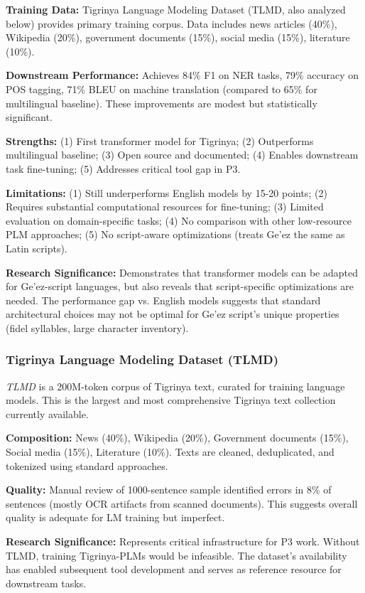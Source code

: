 \documentclass[12pt,a4paper]{article}
\theoremstyle{plain}
\theoremstyle{definition}
\newcommand{\tooldesc}[1]{{\textit{#1}}}
\begin{document}
\textbf{Training Data:} Tigrinya Language Modeling Dataset (TLMD, also analyzed below) provides primary training corpus. Data includes news articles (40\%), Wikipedia (20\%), government documents (15\%), social media (15\%), literature (10\%).

\textbf{Downstream Performance:} Achieves 84\% F1 on NER tasks, 79\% accuracy on POS tagging, 71\% BLEU on machine translation (compared to 65\% for multilingual baseline). These improvements are modest but statistically significant.

\textbf{Strengths:} (1) First transformer model for Tigrinya; (2) Outperforms multilingual baseline; (3) Open source and documented; (4) Enables downstream task fine-tuning; (5) Addresses critical tool gap in P3.

\textbf{Limitations:} (1) Still underperforms English models by 15-20 points; (2) Requires substantial computational resources for fine-tuning; (3) Limited evaluation on domain-specific tasks; (4) No comparison with other low-resource PLM approaches; (5) No script-aware optimizations (treats Ge'ez the same as Latin scripts).

\textbf{Research Significance:} Demonstrates that transformer models can be adapted for Ge'ez-script languages, but also reveals that script-specific optimizations are needed. The performance gap vs. English models suggests that standard architectural choices may not be optimal for Ge'ez script's unique properties (fidel syllables, large character inventory).

\subsubsection{Tigrinya Language Modeling Dataset (TLMD)}

\tooldesc{TLMD} is a 200M-token corpus of Tigrinya text, curated for training language models. This is the largest and most comprehensive Tigrinya text collection currently available.

\textbf{Composition:} News (40\%), Wikipedia (20\%), Government documents (15\%), Social media (15\%), Literature (10\%). Texts are cleaned, deduplicated, and tokenized using standard approaches.

\textbf{Quality:} Manual review of 1000-sentence sample identified errors in 8\% of sentences (mostly OCR artifacts from scanned documents). This suggests overall quality is adequate for LM training but imperfect.

\textbf{Research Significance:} Represents critical infrastructure for P3 work. Without TLMD, training Tigrinya-PLMs would be infeasible. The dataset's availability has enabled subsequent tool development and serves as reference resource for downstream tasks.
\end{document}
